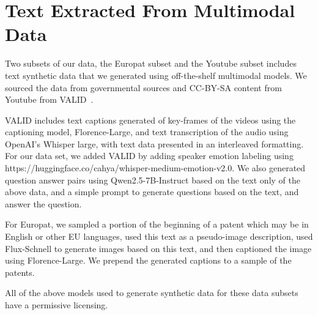 \section{Text Extracted From Multimodal Data}
\label{app:Multimodal data generated}
Two subsets of our data, the Europat subset and the Youtube subset includes text synthetic data that we generated using off-the-shelf multimodal models. We sourced the data from governmental sources and CC-BY-SA content from Youtube from VALID~\citep{Huu2024VALID}.

VALID includes text captions generated of key-frames of the videos using the captioning model, Florence-Large, and text transcription of the audio using OpenAI's Whisper large, with text data presented in an interleaved formatting. For our data set, we added VALID by adding speaker emotion labeling using https://huggingface.co/cahya/whisper-medium-emotion-v2.0. We also generated question answer pairs using Qwen2.5-7B-Instruct based on the text only of the above data, and a simple prompt to generate questions based on the text, and answer the question. 

For Europat, we sampled a portion of the beginning of a patent which may be in English or other EU languages, used this text as a pseudo-image description, used Flux-Schnell to generate images based on this text, and then captioned the image using Florence-Large. We prepend the generated captions to a sample of the patents. 

All of the above models used to generate synthetic data for these data subsets have a permissive licensing. 
